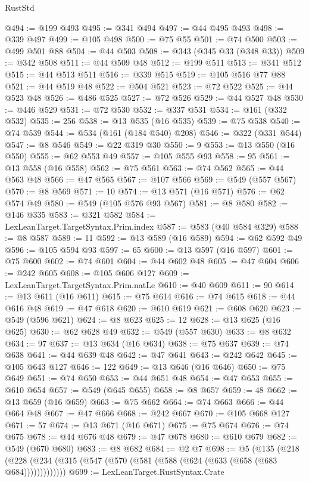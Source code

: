 \begin{lexlean}{RustStd}
\begin{coremodule}
@494 := @199 @493
@495 := @341 @494
@497 := @44 @495 @493
@498 := @339 @497
@499 := @105 @498
@500 := @75 @55
@501 := @74 @500
@503 := @499 @501 @88
@504 := @44 @503
@508 := @343 (@345 @33 (@348 @33))
@509 := @342 @508
@511 := @44 @509 @48
@512 := @199 @511
@513 := @341 @512
@515 := @44 @513 @511
@516 := @339 @515
@519 := @105 @516 @77 @88
@521 := @44 @519 @48
@522 := @504 @521
@523 := @72 @522
@525 := @44 @523 @48
@526 := @486 @525
@527 := @72 @526
@529 := @44 @527 @48
@530 := @446 @529
@531 := @72 @530
@532 := @337 @531
@534 := @161 (@332 @532)
@535 := 256
@538 := @13 @535 (@16 @535)
@539 := @75 @538
@540 := @74 @539
@544 := @534 (@161 (@184 @540) @208)
@546 := @322 (@331 @544)
@547 := @8 @546
@549 := @22 @319 @30
@550 := 9
@553 := @13 @550 (@16 @550)
@555 := @62 @553 @49
@557 := @105 @555 @93
@558 := 95
@561 := @13 @558 (@16 @558)
@562 := @75 @561
@563 := @74 @562
@565 := @44 @563 @48
@566 := @47 @565
@567 := @107 @566
@569 := @549 (@557 @567)
@570 := @8 @569
@571 := 10
@574 := @13 @571 (@16 @571)
@576 := @62 @574 @49
@580 := @549 (@105 @576 @93 @567)
@581 := @8 @580
@582 := @146 @335
@583 := @321 @582
@584 := LexLeanTarget.TargetSyntax.Prim.index
@587 := @583 (@40 @584 @329)
@588 := @8 @587
@589 := 11
@592 := @13 @589 (@16 @589)
@594 := @62 @592 @49
@596 := @105 @594 @93
@597 := 65
@600 := @13 @597 (@16 @597)
@601 := @75 @600
@602 := @74 @601
@604 := @44 @602 @48
@605 := @47 @604
@606 := @242 @605
@608 := @105 @606 @127
@609 := LexLeanTarget.TargetSyntax.Prim.natLe
@610 := @40 @609
@611 := 90
@614 := @13 @611 (@16 @611)
@615 := @75 @614
@616 := @74 @615
@618 := @44 @616 @48
@619 := @47 @618
@620 := @610 @619
@621 := @608 @620
@623 := @549 (@596 @621)
@624 := @8 @623
@625 := 12
@628 := @13 @625 (@16 @625)
@630 := @62 @628 @49
@632 := @549 (@557 @630)
@633 := @8 @632
@634 := 97
@637 := @13 @634 (@16 @634)
@638 := @75 @637
@639 := @74 @638
@641 := @44 @639 @48
@642 := @47 @641
@643 := @242 @642
@645 := @105 @643 @127
@646 := 122
@649 := @13 @646 (@16 @646)
@650 := @75 @649
@651 := @74 @650
@653 := @44 @651 @48
@654 := @47 @653
@655 := @610 @654
@657 := @549 (@645 @655)
@658 := @8 @657
@659 := 48
@662 := @13 @659 (@16 @659)
@663 := @75 @662
@664 := @74 @663
@666 := @44 @664 @48
@667 := @47 @666
@668 := @242 @667
@670 := @105 @668 @127
@671 := 57
@674 := @13 @671 (@16 @671)
@675 := @75 @674
@676 := @74 @675
@678 := @44 @676 @48
@679 := @47 @678
@680 := @610 @679
@682 := @549 (@670 @680)
@683 := @8 @682
@684 := @2 @7
@698 := @5
    (@135 (@218 (@228 (@234 (@315 (@547 (@570 (@581 (@588 (@624 (@633 (@658 (@683 @684)))))))))))))
@699 := LexLeanTarget.RustSyntax.Crate

\end{coremodule}
\end{lexlean}
